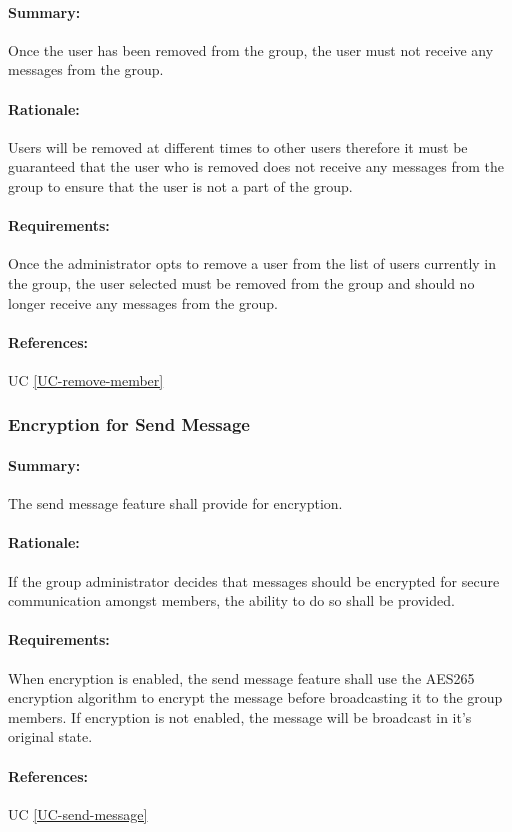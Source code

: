 \documentclass[11pt]{article}
\begin{document}
\paragraph{Summary:}
Once the user has been removed from the group, the user must not receive any messages from the group.
\paragraph{Rationale:}
Users will be removed at different times to other users therefore it must be guaranteed that the user who is removed does not receive any messages from the group to ensure that the user is not a part of the group.
\paragraph{Requirements:}
Once the administrator opts to remove a user from the list of users currently in the group, the user selected must be removed from the group and should no longer receive any messages from the group.
\paragraph{References:} UC \ref{UC-remove-member}

\subsubsection{Encryption for Send Message} \label{FR-send-message-encrypted}
\paragraph{Summary:} The send message feature shall provide for encryption.
\paragraph{Rationale:} If the group administrator decides that messages should be encrypted for secure communication amongst members, the ability to do so shall be provided.
\paragraph{Requirements:} When encryption is enabled, the send message feature shall use the AES265 encryption algorithm to encrypt the message before broadcasting it to the group members. If encryption is not enabled, the message will be broadcast in it's original state.
\paragraph{References:} UC \ref{UC-send-message}
\end{document}
